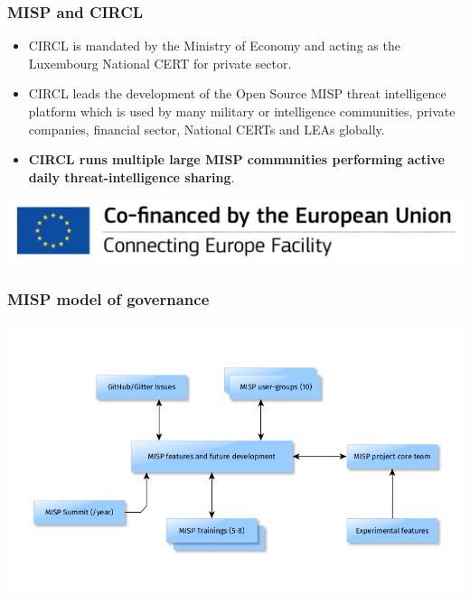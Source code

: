\begin{frame}
\frametitle{MISP and CIRCL}
\begin{itemize}
\item CIRCL is mandated by the Ministry of Economy and acting as the Luxembourg National CERT for private sector.
\item CIRCL leads the development of the Open Source MISP threat intelligence platform which is used by many military or intelligence communities, private companies, financial sector, National CERTs and LEAs globally.
\item {\bf CIRCL runs multiple large MISP communities performing active daily threat-intelligence sharing}.
\end{itemize}
        \includegraphics{en_cef.png}
\end{frame}

\begin{frame}
\frametitle{MISP model of governance}
\includegraphics[scale=0.4]{governance.png}
\end{frame}

